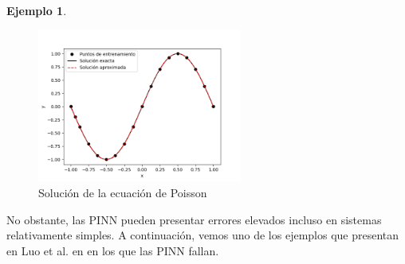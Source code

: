 \documentclass[a4paper,11pt,spanish, twoside, leqno]{tfg-uam}
\theoremstyle{definition}
\newtheorem{exmp}[teor]{Ejemplo}
\begin{document}
\begin{mdframed}
\begin{exmp}
    \begin{figure}[H] 
        \centering
        \includegraphics[width=0.6\textwidth]{Figuras/Poisson.png}
        \caption{Solución de la ecuación de Poisson}
        \label{fig:poisson_PINN}
    \end{figure}
\end{exmp}
\end{mdframed}

No obstante, las PINN pueden presentar errores elevados incluso en sistemas relativamente simples. A continuación, vemos uno de los ejemplos que presentan en Luo et al. en \cite{luo2023residualminimizationpdesfailure} en los que las PINN fallan.
\end{document}
